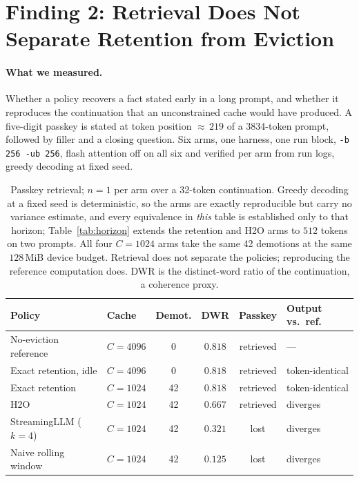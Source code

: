 \documentclass[manuscript,anonymous,review]{acmart}
\begin{document}
\section{Finding 2: Retrieval Does Not Separate Retention from Eviction}
\label{sec:f2}

\paragraph{What we measured.} Whether a policy recovers a fact stated
early in a long prompt, and whether it reproduces the continuation that
an unconstrained cache would have produced. A five-digit passkey is
stated at token position ${\approx}\,219$ of a 3834-token prompt,
followed by filler and a closing question. Six arms, one harness, one
run block, \texttt{-b 256 -ub 256}, flash attention off on all six and
verified per arm from run logs, greedy decoding at fixed seed.

\begin{table}[t]
  \centering
  \caption{Passkey retrieval; $n = 1$ per arm over a 32-token
  continuation. Greedy decoding at a fixed seed is deterministic, so
  the arms are exactly reproducible but carry no variance estimate, and
  every equivalence in \emph{this} table is established only to that
  horizon; Table~\ref{tab:horizon} extends the retention and H2O arms
  to $512$ tokens on two prompts. All four
  $C = 1024$ arms take the same
  42 demotions at the same $128$\,MiB device budget. Retrieval does not
  separate the policies; reproducing the reference computation does.
  DWR is the distinct-word ratio of the continuation, a coherence
  proxy.}
  \label{tab:quality}
  \renewcommand{\arraystretch}{1.25}
  \begin{tabular}{@{}llcccl@{}}
    \toprule
    \textbf{Policy} & \textbf{Cache} & \textbf{Demot.} & \textbf{DWR} &
      \textbf{Passkey} & \textbf{Output vs.\ ref.} \\
    \midrule
    No-eviction reference & $C = 4096$ &  0 & $0.818$ & retrieved & --- \\
    Exact retention, idle & $C = 4096$ &  0 & $0.818$ & retrieved & token-identical \\
    Exact retention       & $C = 1024$ & 42 & $0.818$ & retrieved & token-identical \\
    H2O                   & $C = 1024$ & 42 & $0.667$ & retrieved & diverges \\
    StreamingLLM ($k{=}4$)& $C = 1024$ & 42 & $0.321$ & lost      & diverges \\
    Naive rolling window  & $C = 1024$ & 42 & $0.125$ & lost      & diverges \\
    \bottomrule
  \end{tabular}
\end{table}
\end{document}
